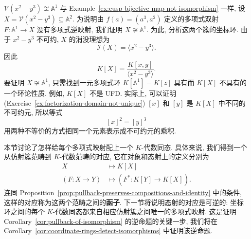 \begin{Example}{$\mathcal{V}(x^{2}-y^{3})\not\cong\mathbb{A}^{1}$}\leavevmode\label{ex:cusp-not-isomorphic-to-line}
  与 Example~\ref{ex:cusp-bijective-map-not-isomorphism} 一样, 设 $X=\mathcal{V}(x^{2}-y^{3})\subseteq\mathbb{A}^{2}$. 为说明由 $f(a)=(a^{3},a^{2})$ 定义的多项式双射 $F:\mathbb{A}^{1}\to X$ 没有多项式逆映射, 我们证明 $X\not\cong\mathbb{A}^{1}$. 为此, 分析这两个簇的坐标环. 由于 $x^{2}-y^{3}$ 不可约, $X$ 的消没理想为
  \[
    \mathcal{I}(X)=\langle x^{2}-y^{3}\rangle.
  \]
  因此
  \[
    K[X]=\frac{K[x,y]}{\langle x^{2}-y^{3}\rangle}.
  \]
  要证明 $X\not\cong\mathbb{A}^{1}$, 只需找到一元多项式环 $K[\mathbb{A}^{1}]=K[z]$ 具有而 $K[X]$ 不具有的一个环论性质. 例如, $K[X]$ 不是 UFD. 实际上, 可以证明 (Exercise~\ref{ex:factorization-domain-not-unique}) $[x]$ 和 $[y]$ 是 $K[X]$ 中不同的不可约元, 所以等式
  \[
    [x]^{2}=[y]^{3}
  \]
  用两种不等价的方式把同一个元素表示成不可约元的乘积.
\end{Example}

本节讨论了怎样给每个多项式映射配上一个 $K$-代数同态. 具体来说, 我们得到一个从仿射簇范畴到 $K$-代数范畴的对应, 它在对象和态射上的定义分别为
\[
  \begin{aligned}
    X&\longmapsto K[X]\\
    (F:X\to Y)&\longmapsto(F^{*}:K[Y]\to K[X]).
  \end{aligned}
\]
连同 Proposition~\ref{prop:pullback-preserves-compositions-and-identity} 中的条件, 这样的对应称为这两个范畴之间的\textbf{函子}. 下一节将说明态射的对应是可逆的: 坐标环之间的每个 $K$-代数同态都来自相应仿射簇之间唯一的多项式映射. 这是证明 Corollary~\ref{cor:pullback-of-isomorphism} 的逆命题的关键一步, 我们将在 Corollary~\ref{cor:coordinate-rings-detect-isomorphisms} 中证明该逆命题.

